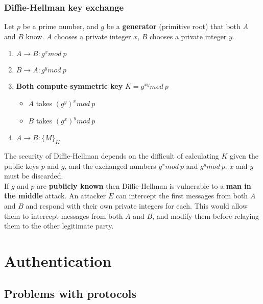 \documentclass[final]{article}
\newcommand{\np}{\vspace{8pt} \\}
\begin{document}
\subsubsection{Diffie-Hellman key exchange}
Let $ p $ be a prime number, and $ g $ be a \textbf{generator} (primitive root) that both $ A $ and $ B $ know. $ A $ chooses a private integer $ x $, $ B $ chooses a private integer $ y $.
\begin{enumerate}
	\item $ A \rightarrow B : g^{x} mod\ p $
	\item $ B \rightarrow A : g^{y} mod\ p $
	\item \textbf{Both compute symmetric key} $ K = g^{xy} mod\ p $
	\begin{itemize}
		\item $ A $ takes $ \left( g^{y} \right)^{x} mod\ p $
		\item $ B $ takes $ \left( g^{x} \right)^{y} mod\ p $
	\end{itemize}
	\item $ A \rightarrow B : \{ M \}_{K} $
\end{enumerate}
The security of Diffie-Hellman depends on the difficult of calculating $ K $ given the public keys $ p $ and $ g $, and the exchanged numbers $ g^{x} mod\ p $ and $ g^{y} mod\ p $. $ x $ and $ y $ must be discarded. \np
If $ g $ and $ p $ are \textbf{publicly known} then Diffie-Hellman is vulnerable to a \textbf{man in the middle} attack. An attacker $ E $ can intercept the first messages from both $ A $ and $ B $ and respond with their own private integers for each. This would allow them to intercept messages from both $ A $ and $ B $, and modify them before relaying them to the other legitimate party.

\section{Authentication}

\subsection{Problems with protocols}
\end{document}
